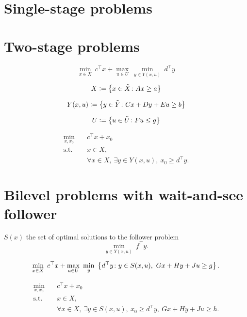 \section{Single-stage problems}

\section{Two-stage problems}

\begin{equation*}
    \min_{x\in X} \ c^\top x + \max_{ u\in U } \ \min_{y\in Y(x,u)} \ d^\top y
\end{equation*}

\begin{equation*}
    X \mathrel{{\mathop:}{=}} \left\{ x\in \tilde{X} \colon Ax \ge a \right\}
\end{equation*}

\begin{equation*}
    Y(x,u) \mathrel{{\mathop:}{=}} \left\{ y\in \tilde{Y} \colon Cx + Dy + Eu \ge b \right\}
\end{equation*}

\begin{equation*}
    U \mathrel{{\mathop:}{=}} \left\{ u\in\tilde{U} \colon Fu \le g \right\}
\end{equation*}

\begin{subequations}
    \begin{align*}
        \min_{x,x_0} \quad & c^\top x + x_0 \\
        \text{s.t.} \quad & x\in X, \\
        & \forall x\in X, \ \exists y\in Y(x,u), \ x_0 \ge d^\top y.
    \end{align*}
\end{subequations}

\section{Bilevel problems with wait-and-see follower}

$S(x)$ the set of optimal solutions to the follower problem
\begin{equation*}
    \min_{y\in Y(x,u)} \ f^\top y.
\end{equation*}

\begin{equation*}
    \min_{x\in X} \ c^\top x + \max_{ u\in U } \ \min_{y} \ \left\{ d^\top y \colon y\in S(x,u), \ Gx + Hy + Ju \ge g \right\}.
\end{equation*}

\begin{subequations}
    \begin{align*}
        \min_{x,x_0} \quad & c^\top x + x_0 \\
        \text{s.t.} \quad & x\in X, \\
        & \forall x\in X, \ \exists y\in S(x,u), \ x_0 \ge d^\top y, \ Gx + Hy + Ju \ge h.
    \end{align*}
\end{subequations}
